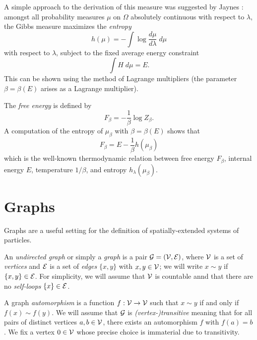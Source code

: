 A simple approach to the derivation of this measure was suggested by Jaynes \cite{Jaynes57}:
amongst all probability measures $\mu$ on $\Omega$ absolutely
continuous with respect to $\lambda$, the Gibbs measure maximizes the \emph{entropy}
\begin{equation}
\label{e:entropy-def}
h(\mu) = -\int \log \frac{d\mu}{d\lambda} \; d\mu
\end{equation}
with respect to $\lambda$, subject to the fixed average energy constraint
\begin{equation}
\int H \; d\mu = E.
\end{equation}
This can be shown using the method of Lagrange multipliers
(the parameter $\beta = \beta(E)$ arises as a Lagrange multiplier).

The \emph{free energy} is defined by
\begin{equation}
F_\beta = -\frac{1}{\beta} \log Z_\beta.
\end{equation}
A computation of the entropy of $\mu_\beta$ with $\beta = \beta(E)$ shows that
\begin{equation}
F_\beta = E - \frac{1}{\beta} h(\mu_\beta)
\end{equation}
which is the well-known thermodynamic relation between free energy $F_\beta$,
internal energy $E$, temperature $1/\beta$, and entropy $h_\lambda(\mu_\beta)$.


\section{Graphs}

Graphs are a useful setting for the definition of spatially-extended systems of
particles.

An \emph{undirected graph} or simply a \emph{graph} is a pair $\mathcal{G} = (\mathcal{V}, \mathcal{E})$,
where $\mathcal{V}$
is a set of \emph{vertices} and $\mathcal{E}$ is a set of
\emph{edges} $\{ x, y \}$ with $x, y \in \mathcal{V}$; we will write $x \sim y$ if
$\{ x, y \} \in \mathcal{E}$.
For simplicity, we will assume that $\mathcal{V}$ is countable annd that there are no
\emph{self-loops} $\{ x \} \in \mathcal{E}$.

A graph \emph{automorphism} is a function $f : \mathcal{V}\rightarrow\mathcal{V}$ such that
$x \sim y$ if and only if $f(x) \sim f(y)$.
We will assume that $\mathcal{G}$ is \emph{(vertex-)transitive} meaning that for all pairs
of distinct
vertices $a, b \in \mathcal{V}$, there exists an automorphism $f$ with $f(a) = b$.
We fix a vertex $0\in\mathcal{V}$ whose precise choice is immaterial due to
transitivity.

